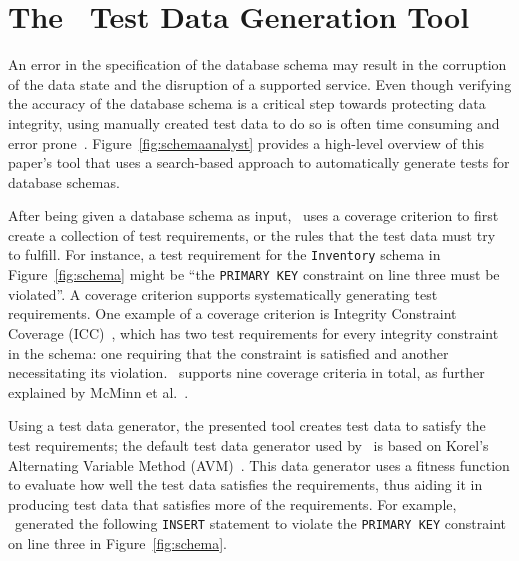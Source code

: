 \section{The \sa~Test Data Generation Tool}\label{sec:technique}


An error in the specification of the database schema may result in the corruption of the data state and the disruption
of a supported service. Even though verifying the accuracy of the database schema is a critical step towards protecting
data integrity, using manually created test data to do so is often time consuming and error
prone~\cite{kapfhammer2013search}. Figure~\ref{fig:schemaanalyst} provides a high-level overview of this paper's tool
that uses a search-based approach to automatically generate tests for database schemas.

After being given a database schema as input, \sa~uses a coverage criterion to first create a collection of test
requirements, or the rules that the test data must try to fulfill. For instance, a test requirement for the
\texttt{Inventory} schema in Figure~\ref{fig:schema} might be ``the \texttt{PRIMARY KEY} constraint on line three must
be violated''. A coverage criterion supports systematically generating test requirements. One example of a coverage
criterion is Integrity Constraint Coverage (ICC)~\cite{mcminn2015effectiveness}, which has two test requirements for
every integrity constraint in the schema: one requiring that the constraint is satisfied and another necessitating its
violation.  \sa~supports nine coverage criteria in total, as further explained by McMinn et
al.~\cite{mcminn2015effectiveness}.



Using a test data generator, the presented tool creates test data to satisfy the test requirements; the default test
data generator used by \sa~is based on Korel's Alternating Variable Method (AVM)~\cite{Korel:AVM}. This data generator
uses a fitness function to evaluate how well the test data satisfies the requirements, thus aiding it in producing
test data that satisfies more of the requirements. For example, \sa~generated the following \texttt{INSERT} statement to
violate the \texttt{PRIMARY KEY} constraint on line three in Figure~\ref{fig:schema}.

